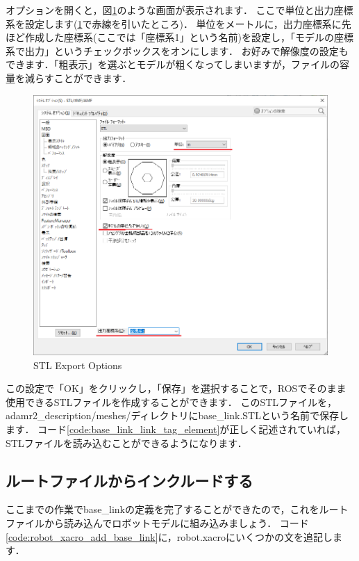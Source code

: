 \documentclass[{../../master}]{subfiles}
\begin{document}
\noindent
オプションを開くと，図\ref{fig:base_link_stl_export_options}のような画面が表示されます．
ここで単位と出力座標系を設定します(\ref{fig:base_link_stl_export_options}で赤線を引いたところ)．
単位をメートルに，出力座標系に先ほど作成した座標系(ここでは「座標系1」という名前)を設定し，「モデルの座標系で出力」というチェックボックスをオンにします．
お好みで解像度の設定もできます．「粗表示」を選ぶとモデルが粗くなってしまいますが，ファイルの容量を減らすことができます．

\begin{figure}[ht]
  \centering
  \includegraphics[width=100truemm, clip]{images/base_link_stl_export_options.png}
  \caption{STL Export Options}
  \label{fig:base_link_stl_export_options}
\end{figure}

この設定で「OK」をクリックし，「保存」を選択することで，ROSでそのまま使用できるSTLファイルを作成することができます．
このSTLファイルを，\textsf{adamr2\_description/meshes/}ディレクトリに\textsf{base\_link.STL}という名前で保存します．
コード\ref{code:base_link_link_tag_element}が正しく記述されていれば，STLファイルを読み込むことができるようになります．

\subsection{ルートファイルからインクルードする}
\label{sec:base_link_include}

ここまでの作業で\textsf{base\_link}の定義を完了することができたので，これをルートファイルから読み込んでロボットモデルに組み込みましょう．
コード\ref{code:robot_xacro_add_base_link}に，\textsf{robot.xacro}にいくつかの文を追記します．
\end{document}
